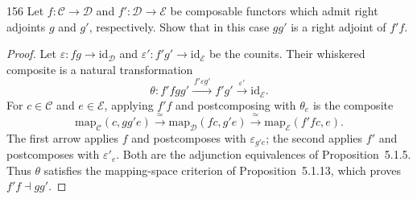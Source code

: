 \begin{exercise}{156}
Let $f\colon\mathcal{C}\to\mathcal{D}$ and $f'\colon\mathcal{D}\to\mathcal{E}$ be composable functors which admit right
adjoints $g$ and $g'$, respectively. Show that in this case $gg'$ is a right adjoint of $f'f$.

\begin{proof}
Let $\varepsilon\colon fg\to\mathrm{id}_{\mathcal{D}}$ and
$\varepsilon'\colon f'g'\to\mathrm{id}_{\mathcal{E}}$ be the counits.
Their whiskered composite is a natural transformation
\[
 \theta\colon f'fgg'
 \xrightarrow{\ f'\varepsilon g'\ }f'g'
 \xrightarrow{\ \varepsilon'\ }\mathrm{id}_{\mathcal{E}}.
\]
For $c\in\mathcal{C}$ and $e\in\mathcal{E}$, applying $f'f$ and
postcomposing with $\theta_e$ is the composite
\[
 \mathrm{map}_{\mathcal{C}}(c,gg'e)
 \xrightarrow{\ \simeq\ }\mathrm{map}_{\mathcal{D}}(fc,g'e)
 \xrightarrow{\ \simeq\ }\mathrm{map}_{\mathcal{E}}(f'fc,e).
\]
The first arrow applies $f$ and postcomposes with
$\varepsilon_{g'e}$; the second applies $f'$ and postcomposes with
$\varepsilon'_e$.
Both are the adjunction equivalences of Proposition~5.1.5.
Thus $\theta$ satisfies the mapping-space criterion of
Proposition~5.1.13, which proves $f'f\dashv gg'$.
\end{proof}
\end{exercise}
